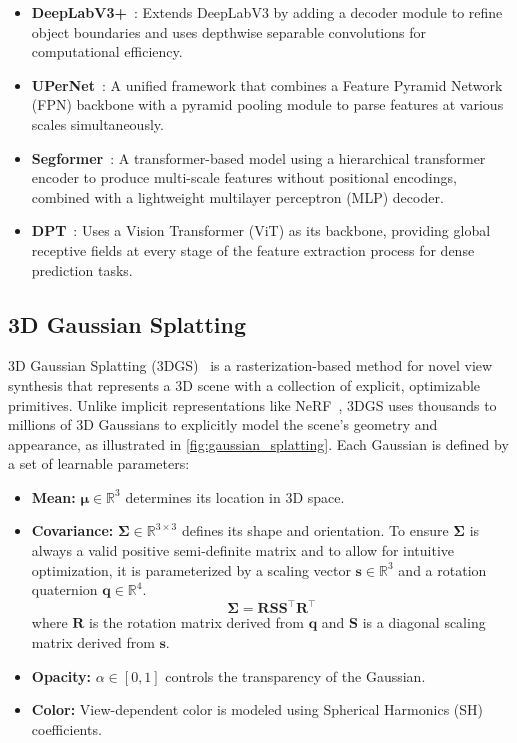 \begin{itemize}
	\item \textbf{DeepLabV3+}~\cite{chen_encoder-decoder_2018}: Extends DeepLabV3 by adding a decoder module to refine object boundaries and uses depthwise separable convolutions for computational efficiency.

	\item \textbf{UPerNet}~\cite{xiao_unified_2018}: A unified framework that combines a Feature Pyramid Network (FPN) backbone with a pyramid pooling module to parse features at various scales simultaneously.

	\item \textbf{Segformer}~\cite{xie_segformer_2021}: A transformer-based model using a hierarchical transformer encoder to produce multi-scale features without positional encodings, combined with a lightweight multilayer perceptron (MLP) decoder.

	\item \textbf{DPT}~\cite{ranftl_vision_2021}: Uses a Vision Transformer (ViT) as its backbone, providing global receptive fields at every stage of the feature extraction process for dense prediction tasks.
\end{itemize}

\subsection{3D Gaussian Splatting}
3D Gaussian Splatting (3DGS)~\cite{kerbl_3d_2023} is a rasterization-based method for novel view synthesis that represents a 3D scene with a collection of explicit, optimizable primitives. Unlike implicit representations like NeRF~\cite{mildenhall_nerf_2021}, 3DGS uses thousands to millions of 3D Gaussians to explicitly model the scene's geometry and appearance, as illustrated in \cref{fig:gaussian_splatting}.
Each Gaussian is defined by a set of learnable parameters:
\begin{itemize}
	\item \textbf{Mean:} $\boldsymbol{\mu} \in \mathbb{R}^3$ determines its location in 3D space.
	\item \textbf{Covariance:} $\boldsymbol{\Sigma} \in \mathbb{R}^{3 \times 3}$ defines its shape and orientation. To ensure $\boldsymbol{\Sigma}$ is always a valid positive semi-definite matrix and to allow for intuitive optimization, it is parameterized by a scaling vector $\mathbf{s} \in \mathbb{R}^3$ and a rotation quaternion $\mathbf{q} \in \mathbb{R}^4$.
	      \begin{equation}
		      \boldsymbol{\Sigma} = \mathbf{R} \mathbf{S} \mathbf{S}^\top \mathbf{R}^\top
	      \end{equation}
	      where $\mathbf{R}$ is the rotation matrix derived from $\mathbf{q}$ and $\mathbf{S}$ is a diagonal scaling matrix derived from $\mathbf{s}$.
	\item \textbf{Opacity:} $\alpha \in [0, 1]$ controls the transparency of the Gaussian.
	\item \textbf{Color:} View-dependent color is modeled using Spherical Harmonics (SH) coefficients.
\end{itemize}

